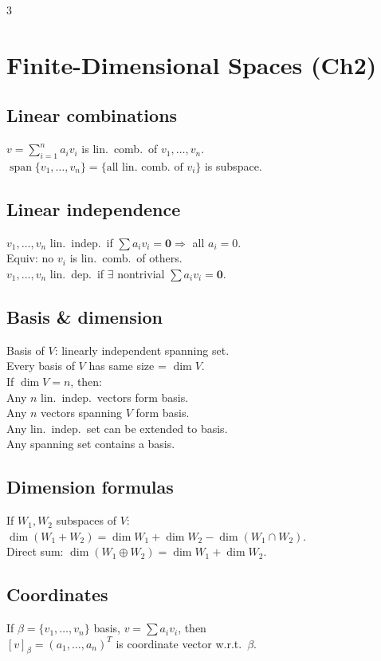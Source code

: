 \documentclass[10pt]{article}
\newcommand{\spann}{\operatorname{span}}
\begin{document}
\begin{multicols}{3}
\section*{Finite-Dimensional Spaces (Ch2)}

\subsection*{Linear combinations}
$v=\sum_{i=1}^n a_iv_i$ is lin.\ comb.\ of $v_1,\ldots,v_n$.\\
$\spann\{v_1,\ldots,v_n\}=\{\text{all lin.\ comb.\ of }v_i\}$ is subspace.

\subsection*{Linear independence}
$v_1,\ldots,v_n$ lin.\ indep.\ if $\sum a_iv_i=\bm{0}\Rightarrow$ all $a_i=0$.\\
Equiv: no $v_i$ is lin.\ comb.\ of others.\\
$v_1,\ldots,v_n$ lin.\ dep.\ if $\exists$ nontrivial $\sum a_iv_i=\bm{0}$.

\subsection*{Basis \& dimension}
Basis of $V$: linearly independent spanning set.\\
Every basis of $V$ has same size = $\dim V$.\\
If $\dim V=n$, then:\\
\quad Any $n$ lin.\ indep.\ vectors form basis.\\
\quad Any $n$ vectors spanning $V$ form basis.\\
\quad Any lin.\ indep.\ set can be extended to basis.\\
\quad Any spanning set contains a basis.

\subsection*{Dimension formulas}
If $W_1,W_2$ subspaces of $V$:\\
$\dim(W_1+W_2)=\dim W_1+\dim W_2-\dim(W_1\cap W_2)$.\\
Direct sum: $\dim(W_1\oplus W_2)=\dim W_1+\dim W_2$.

\subsection*{Coordinates}
If $\beta=\{v_1,\ldots,v_n\}$ basis, $v=\sum a_iv_i$, then\\
$[v]_\beta=(a_1,\ldots,a_n)^T$ is coordinate vector w.r.t.\ $\beta$.


\end{multicols}
\end{document}
